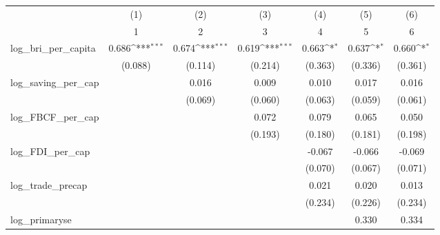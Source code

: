 {
\def\sym#1{\ifmmode^{#1}\else\(^{#1}\)\fi}
\begin{tabular}{l*{6}{c}}
\toprule
            &\multicolumn{1}{c}{(1)}&\multicolumn{1}{c}{(2)}&\multicolumn{1}{c}{(3)}&\multicolumn{1}{c}{(4)}&\multicolumn{1}{c}{(5)}&\multicolumn{1}{c}{(6)}\\
            &\multicolumn{1}{c}{1}&\multicolumn{1}{c}{2}&\multicolumn{1}{c}{3}&\multicolumn{1}{c}{4}&\multicolumn{1}{c}{5}&\multicolumn{1}{c}{6}\\
\midrule
log\_bri\_per\_capita&       0.686\sym{***}&       0.674\sym{***}&       0.619\sym{***}&       0.663\sym{*}  &       0.637\sym{*}  &       0.660\sym{*}  \\
            &     (0.088)         &     (0.114)         &     (0.214)         &     (0.363)         &     (0.336)         &     (0.361)         \\
\addlinespace
log\_saving\_per\_cap&                     &       0.016         &       0.009         &       0.010         &       0.017         &       0.016         \\
            &                     &     (0.069)         &     (0.060)         &     (0.063)         &     (0.059)         &     (0.061)         \\
\addlinespace
log\_FBCF\_per\_cap&                     &                     &       0.072         &       0.079         &       0.065         &       0.050         \\
            &                     &                     &     (0.193)         &     (0.180)         &     (0.181)         &     (0.198)         \\
\addlinespace
log\_FDI\_per\_cap&                     &                     &                     &      -0.067         &      -0.066         &      -0.069         \\
            &                     &                     &                     &     (0.070)         &     (0.067)         &     (0.071)         \\
\addlinespace
log\_trade\_precap&                     &                     &                     &       0.021         &       0.020         &       0.013         \\
            &                     &                     &                     &     (0.234)         &     (0.226)         &     (0.234)         \\
\addlinespace
log\_primaryse&                     &                     &                     &                     &       0.330         &       0.334         \\

\end{tabular}}
